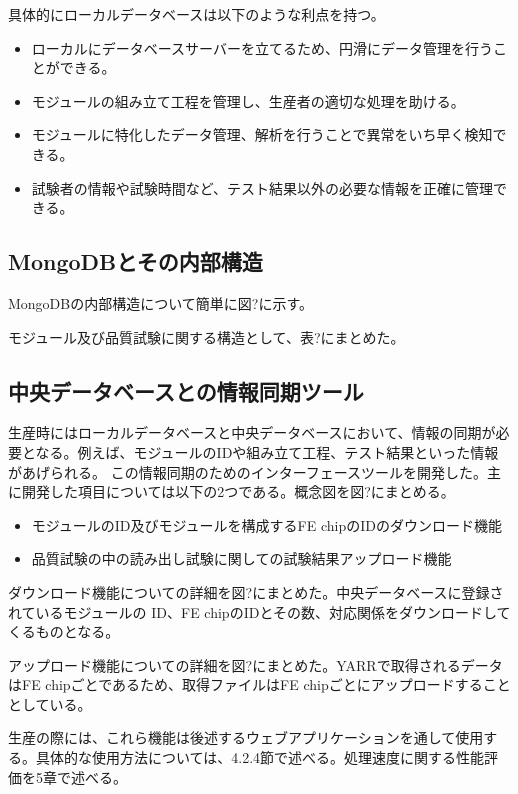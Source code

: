具体的にローカルデータベースは以下のような利点を持つ。

\begin{itemize}
  \item ローカルにデータベースサーバーを立てるため、円滑にデータ管理を行うことができる。
  \item モジュールの組み立て工程を管理し、生産者の適切な処理を助ける。
  \item モジュールに特化したデータ管理、解析を行うことで異常をいち早く検知できる。
  \item 試験者の情報や試験時間など、テスト結果以外の必要な情報を正確に管理できる。
\end{itemize}


\subsection{MongoDBとその内部構造}
MongoDBの内部構造について簡単に図?に示す。

モジュール及び品質試験に関する構造として、表?にまとめた。

\subsection{中央データベースとの情報同期ツール}
生産時にはローカルデータベースと中央データベースにおいて、情報の同期が必要となる。例えば、モジュールのIDや組み立て工程、テスト結果といった情報があげられる。
この情報同期のためのインターフェースツールを開発した。主に開発した項目については以下の2つである。概念図を図?にまとめる。
\begin{itemize}
  \item モジュールのID及びモジュールを構成するFE chipのIDのダウンロード機能
  \item 品質試験の中の読み出し試験に関しての試験結果アップロード機能
\end{itemize}

ダウンロード機能についての詳細を図?にまとめた。中央データベースに登録されているモジュールの ID、FE chipのIDとその数、対応関係をダウンロードしてくるものとなる。


アップロード機能についての詳細を図?にまとめた。YARRで取得されるデータはFE chipごとであるため、取得ファイルはFE chipごとにアップロードすることとしている。


生産の際には、これら機能は後述するウェブアプリケーションを通して使用する。具体的な使用方法については、4.2.4節で述べる。処理速度に関する性能評価を5章で述べる。



